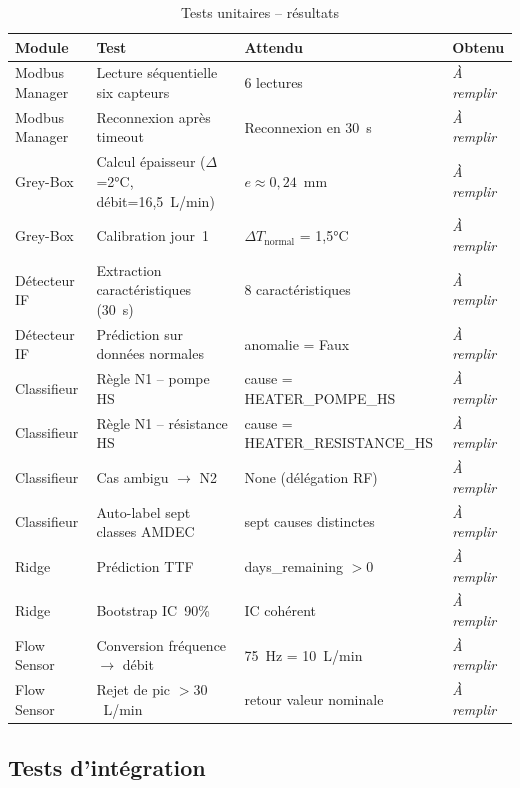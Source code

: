 \begin{table}[htbp]
\centering
\renewcommand{\arraystretch}{1.45}
\caption{Tests unitaires -- résultats}
\label{tab:tests_unitaires}
\begin{tabular}{|p{}|p{}|p{}|p{}|}
\hline
\rowcolor{gray!25}
\textbf{Module} & \textbf{Test} & \textbf{Attendu} & \textbf{Obtenu} \\
\hline
Modbus Manager & Lecture séquentielle six capteurs & 6 lectures & \textit{À remplir} \\
\hline
Modbus Manager & Reconnexion après timeout & Reconnexion en 30~s & \textit{À remplir} \\
\hline
Grey-Box & Calcul épaisseur (\(\Delta\)=2°C, débit=16,5~L/min) & \(e \approx 0,24\)~mm & \textit{À remplir} \\
\hline
Grey-Box & Calibration jour~1 & \(\Delta T_{\text{normal}}\) = 1,5°C & \textit{À remplir} \\
\hline
Détecteur IF & Extraction caractéristiques (30~s) & 8 caractéristiques & \textit{À remplir} \\
\hline
Détecteur IF & Prédiction sur données normales & anomalie = Faux & \textit{À remplir} \\
\hline
Classifieur & Règle N1 -- pompe HS & cause = HEATER\_\allowbreak POMPE\_\allowbreak HS & \textit{À remplir} \\
\hline
Classifieur & Règle N1 -- résistance HS & cause = HEATER\_\allowbreak RESISTANCE\_\allowbreak HS & \textit{À remplir} \\
\hline
Classifieur & Cas ambigu \(\rightarrow\) N2 & None (délégation RF) & \textit{À remplir} \\
\hline
Classifieur & Auto-label sept classes AMDEC & sept causes distinctes & \textit{À remplir} \\
\hline
Ridge & Prédiction TTF & days\_\allowbreak remaining \(>0\) & \textit{À remplir} \\
\hline
Ridge & Bootstrap IC~90\% & IC cohérent & \textit{À remplir} \\
\hline
Flow Sensor & Conversion fréquence \(\rightarrow\) débit & 75~Hz = 10~L/min & \textit{À remplir} \\
\hline
Flow Sensor & Rejet de pic \(>30\)~L/min & retour valeur nominale & \textit{À remplir} \\
\hline
\end{tabular}
\end{table}

\subsection{Tests d'intégration}

